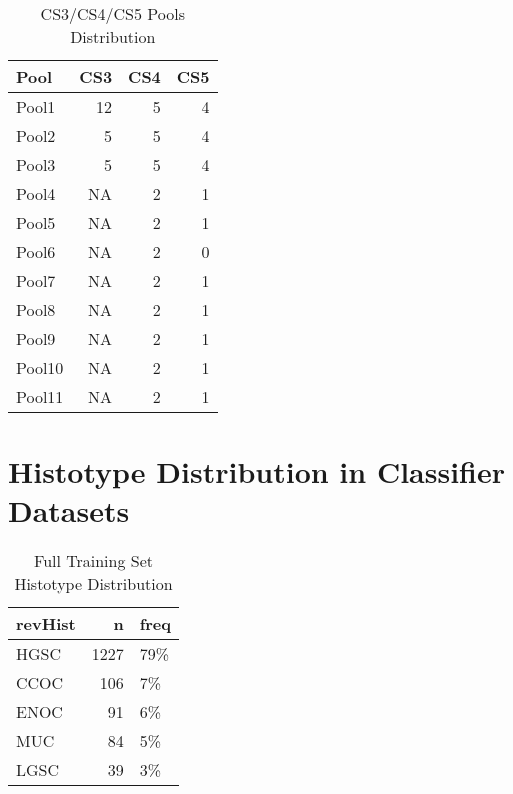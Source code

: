 \documentclass[
]{report}
\begin{document}
\begin{table}

\caption{\label{tab:cs345-pools}CS3/CS4/CS5 Pools Distribution}
\centering
\begin{tabular}[t]{l|r|r|r}
\hline
Pool & CS3 & CS4 & CS5\\
\hline
Pool1 & 12 & 5 & 4\\
\hline
Pool2 & 5 & 5 & 4\\
\hline
Pool3 & 5 & 5 & 4\\
\hline
Pool4 & NA & 2 & 1\\
\hline
Pool5 & NA & 2 & 1\\
\hline
Pool6 & NA & 2 & 0\\
\hline
Pool7 & NA & 2 & 1\\
\hline
Pool8 & NA & 2 & 1\\
\hline
Pool9 & NA & 2 & 1\\
\hline
Pool10 & NA & 2 & 1\\
\hline
Pool11 & NA & 2 & 1\\
\hline
\end{tabular}
\end{table}

\hypertarget{histotype-distribution-in-classifier-datasets}{%
\section{Histotype Distribution in Classifier Datasets}\label{histotype-distribution-in-classifier-datasets}}

\begin{table}

\caption{\label{tab:train-hist}Full Training Set Histotype Distribution}
\centering
\begin{tabular}[t]{l|r|l}
\hline
revHist & n & freq\\
\hline
HGSC & 1227 & 79\%\\
\hline
CCOC & 106 & 7\%\\
\hline
ENOC & 91 & 6\%\\
\hline
MUC & 84 & 5\%\\
\hline
LGSC & 39 & 3\%\\
\hline
\end{tabular}
\end{table}
\end{document}
